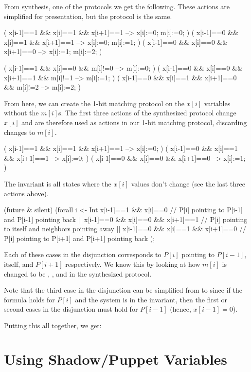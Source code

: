 From synthesis, one of the protocols we get the following.
These actions are simplified for presentation, but the protocol is the same.
\begin{code}
( x[i-1]==1 && x[i]==1 && x[i+1]==1 --> x[i]:=0; m[i]:=0; )
( x[i-1]==0 && x[i]==1 && x[i+1]==1 --> x[i]:=0; m[i]:=1; )
( x[i-1]==0 && x[i]==0 && x[i+1]==0 --> x[i]:=1; m[i]:=2; )

( x[i-1]==1 && x[i]==0              && m[i]!=0 --> m[i]:=0; )
( x[i-1]==0 && x[i]==0 && x[i+1]==1 && m[i]!=1 --> m[i]:=1; )
( x[i-1]==0 && x[i]==1 && x[i+1]==0 && m[i]!=2 --> m[i]:=2; )
\end{code}

From here, we can create the 1-bit matching protocol on the $x[i]$ variables without the $m[i]$s.
The first three actions of the synthesized protocol change $x[i]$ and are therefore used as actions in our 1-bit matching protocol, discarding changes to $m[i]$.
\begin{code}
( x[i-1]==1 && x[i]==1 && x[i+1]==1 --> x[i]:=0; )
( x[i-1]==0 && x[i]==1 && x[i+1]==1 --> x[i]:=0; )
( x[i-1]==0 && x[i]==0 && x[i+1]==0 --> x[i]:=1; )
\end{code}

The invariant is all states where the $x[i]$ values don't change (see the last three actions above).
\begin{code}
(future & silent)
  (forall i <- Int %
      x[i-1]==1 && x[i]==0               // P[i] pointing to P[i-1] and P[i-1] pointing back
   || x[i-1]==0 && x[i]==0 && x[i+1]==1  // P[i] pointing to itself and neighbors pointing away
   || x[i-1]==0 && x[i]==1 && x[i+1]==0  // P[i] pointing to P[i+1] and P[i+1] pointing back
  );
\end{code}
Each of these cases in the disjunction corresponds to $P[i]$ pointing to $P[i-1]$, itself, and $P[i+1]$ respectively.
We know this by looking at how $m[i]$ is changed to be , , and  in the synthesized protocol.

Note that the third case in the disjunction can be simplified from  to  since if the formula holds for $P[i]$ and the system is in the invariant, then the first or second cases in the disjunction must hold for $P[i-1]$ (hence, $x[i-1]=0$).

Putting this all together, we get:

\section{Using Shadow/Puppet Variables}

